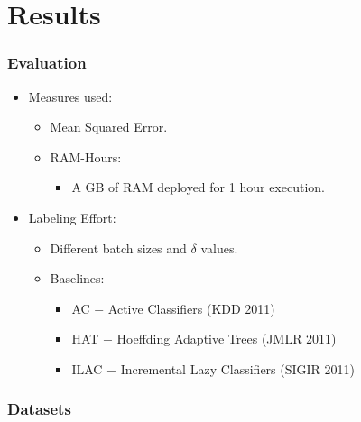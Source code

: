 \documentclass[14pt]{beamer}
\begin{document}
\section{Results}
\begin{frame}\frametitle{Evaluation}

\begin{itemize}
\item Measures used:
\begin{itemize}
\item Mean Squared Error.
\item RAM-Hours:
\begin{itemize}
\item A GB of RAM deployed for 1 hour execution.
\end{itemize}
\end{itemize}
\item Labeling Effort:
\begin{itemize}
\item Different batch sizes and $\delta$ values.
\end{itemize}
\begin{itemize}
\item Baselines:
\begin{itemize}
\item AC $-$ Active Classifiers (KDD 2011)
\item HAT $-$ Hoeffding Adaptive Trees (JMLR 2011)
\item ILAC $-$ Incremental Lazy Classifiers (SIGIR 2011)
\end{itemize}
\end{itemize}
\end{itemize}

\end{frame}

\begin{frame}\frametitle{Datasets}
\begin{table}
\centering

\end{table}
\end{frame}
\end{document}

